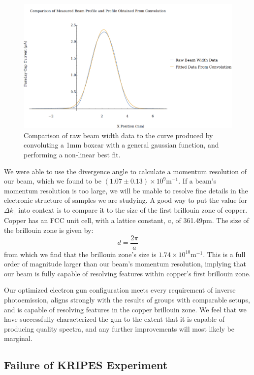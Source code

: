 \begin{figure}[h!]
    \centering
    \includegraphics[width=0.85\linewidth]{../Beam Divergence/Plots/Convolution.png}
    \caption{Comparison of raw beam width data to the curve produced by convoluting a 1mm boxcar with a general gaussian function, and performing 
    a non-linear best fit.}
    \label{fig:convolution}
\end{figure}

We were able to use the divergence angle to calculate a momentum resolution of our beam, which we found to be $(1.07\pm0.13)\times10^9\mathrm{m}^{-1}$. 
If a beam's momentum resolution is too large, we will be unable to resolve fine details in the electronic structure of samples we are studying. 
A good way to put the value for $\Delta k_\parallel$ into context is to compare it to the size of the first brillouin zone of copper. Copper has 
an FCC unit cell, with a lattice constant, $a$, of 361.49pm\cite{reference.wolfram_2021_elementdata}. The size of the brillouin zone is given by:
\begin{equation}
    d = \frac{2\pi}{a}
\end{equation}
from which we find that the brillouin zone's size is  $1.74\times10^{10}\mathrm{m}^{-1}$. This is a full order of magnitude larger than our beam's momentum 
resolution, implying that our beam is fully capable of resolving features within copper's first brillouin zone. 

Our optimized electron gun configuration meets every requirement of inverse photoemission, aligns strongly with the results of groups with 
comparable setups, and is capable of resolving features in the copper brillouin zone. We feel that we have successfully characterized the gun to the 
extent that it is capable of producing quality spectra, and any further improvements will most likely be marginal. 

\subsection{Failure of KRIPES Experiment}

